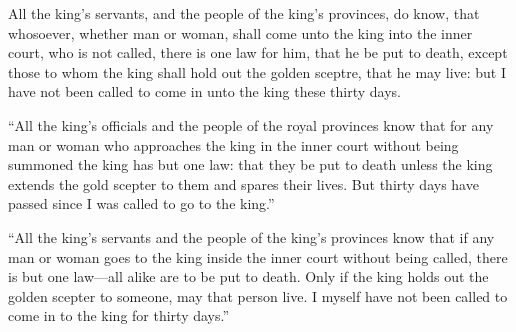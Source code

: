 			\begin{versebox}
					\item[BHS] 
					\item[LXX] 
					\item[ASV] All the king's servants, and the people of the king's provinces, do know, that whosoever, whether man or woman, shall come unto the king into the inner court, who is not called, there is one law for him, that he be put to death, except those to whom the king shall hold out the golden sceptre, that he may live: but I have not been called to come in unto the king these thirty days.
					\item[NIV] “All the king’s officials and the people of the royal provinces know that for any man or woman who approaches the king in the inner court without being summoned the king has but one law: that they be put to death unless the king extends the gold scepter to them and spares their lives. But thirty days have passed since I was called to go to the king.”
					\item[NRSV] “All the king’s servants and the people of the king’s provinces know that if any man or woman goes to the king inside the inner court without being called, there is but one law—all alike are to be put to death. Only if the king holds out the golden scepter to someone, may that person live. I myself have not been called to come in to the king for thirty days.”
			\end{versebox}


